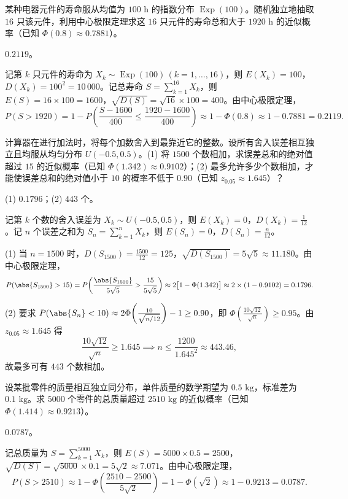 \begin{exercise}
某种电器元件的寿命服从均值为 $100\text{ h}$ 的指数分布 $\operatorname{Exp}(100)$。随机独立地抽取 $16$ 只该元件，利用中心极限定理求这 $16$ 只元件的寿命总和大于 $1920\text{ h}$ 的近似概率（已知 $\Phi(0.8)\approx 0.7881$）。
\begin{answer}
$0.2119$。
\end{answer}
\begin{solution}
记第 $k$ 只元件的寿命为 $X_k\sim\operatorname{Exp}(100)\,(k=1,\ldots,16)$，则 $E(X_k)=100$，$D(X_k)=100^2=10\,000$。记总寿命 $S=\sum_{k=1}^{16}X_k$，则 $E(S)=16\times 100=1600$，$\sqrt{D(S)}=\sqrt{16}\times 100=400$。由中心极限定理，
\[
  P(S>1920)=1-P\!\left(\frac{S-1600}{400}\le\frac{1920-1600}{400}\right)
  \approx 1-\Phi(0.8)\approx 1-0.7881=0.2119.
\]
\end{solution}
\end{exercise}

\begin{exercise}
计算器在进行加法时，将每个加数舍入到最靠近它的整数。设所有舍入误差相互独立且均服从均匀分布 $U(-0.5,0.5)$。(1) 将 $1500$ 个数相加，求误差总和的绝对值超过 $15$ 的近似概率（已知 $\Phi(1.342)\approx 0.9102$）；(2) 最多允许多少个数相加，才能使误差总和的绝对值小于 $10$ 的概率不低于 $0.90$（已知 $z_{0.05}\approx 1.645$）？
\begin{answer}
(1) $0.1796$；(2) $443$ 个。
\end{answer}
\begin{solution}
记第 $k$ 个数的舍入误差为 $X_k\sim U(-0.5,0.5)$，则 $E(X_k)=0$，$D(X_k)=\frac{1}{12}$。记 $n$ 个误差之和为 $S_n=\sum_{k=1}^{n}X_k$，则 $E(S_n)=0$，$D(S_n)=\frac{n}{12}$。

(1) 当 $n=1500$ 时，$D(S_{1500})=\frac{1500}{12}=125$，$\sqrt{D(S_{1500})}=5\sqrt{5}\approx 11.180$。由中心极限定理，
\[
  P(\abs{S_{1500}}>15)
  =P\!\left(\frac{\abs{S_{1500}}}{5\sqrt{5}}>\frac{15}{5\sqrt{5}}\right)
  \approx 2\bigl[1-\Phi(1.342)\bigr]\approx 2\times(1-0.9102)=0.1796.
\]

(2) 要求 $P(\abs{S_n}<10)\approx 2\Phi\!\left(\frac{10}{\sqrt{n/12}}\right)-1\ge 0.90$，即 $\Phi\!\left(\frac{10\sqrt{12}}{\sqrt{n}}\right)\ge 0.95$。由 $z_{0.05}\approx 1.645$ 得
\[
  \frac{10\sqrt{12}}{\sqrt{n}}\ge 1.645 \implies n\le\frac{1200}{1.645^2}\approx 443.46,
\]
故最多可有 $443$ 个数相加。
\end{solution}
\end{exercise}

\begin{exercise}
设某批零件的质量相互独立同分布，单件质量的数学期望为 $0.5\text{ kg}$，标准差为 $0.1\text{ kg}$。求 $5000$ 个零件的总质量超过 $2510\text{ kg}$ 的近似概率（已知 $\Phi(1.414)\approx 0.9213$）。
\begin{answer}
$0.0787$。
\end{answer}
\begin{solution}
记总质量为 $S=\sum_{k=1}^{5000}X_k$，则 $E(S)=5000\times 0.5=2500$，$\sqrt{D(S)}=\sqrt{5000}\times 0.1=5\sqrt{2}\approx 7.071$。由中心极限定理，
\[
  P(S>2510)\approx 1-\Phi\!\left(\frac{2510-2500}{5\sqrt{2}}\right)
  =1-\Phi(\sqrt{2})\approx 1-0.9213=0.0787.
\]
\end{solution}
\end{exercise}

